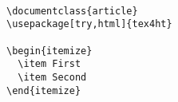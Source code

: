 
\begin{lstlisting}
 
\documentclass{article} 
\usepackage[try,html]{tex4ht} 
   
\begin{itemize} 
  \item First 
  \item Second 
\end{itemize} 
   

\end{lstlisting}

